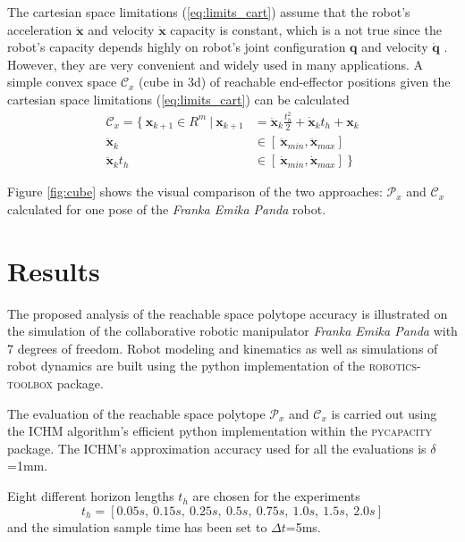 The cartesian space limitations (\ref{eq:limits_cart}) assume that the robot's acceleration $\ddot{\bm{x}}$ and velocity $\dot{\bm{x}}$ capacity is constant, which is a not true since the robot's capacity depends highly on robot's joint configuration $\bm{q}$ and velocity  $\dot{\bm{q}}$ \cite{Bowling2005}\cite{skuric2021}. However, they are very convenient and widely used in many applications. A simple convex space $\mathcal{C}_x$ (cube in 3d) of reachable end-effector positions given the cartesian space limitations (\ref{eq:limits_cart}) can be calculated
\begin{equation}
\begin{split}
    \mathcal{C}_x = \{ ~\bm{x}_{k+1} \in R^m ~|~ \bm{x}_{k+1} &= \ddot{\bm{x}}_{k}\frac{t_h^2}{2} + \dot{\bm{x}}_kt_h + \bm{x}_k \\
    \ddot{\bm{x}}_{k} &\in [~ \ddot{\bm{x}}_{min},  \ddot{\bm{x}}_{max}]\\
    \ddot{\bm{x}}_{k}t_h &\in [~ \dot{\bm{x}}_{min},  \dot{\bm{x}}_{max}] ~\}
\end{split}
\end{equation}

Figure \ref{fig:cube} shows the visual comparison of the two approaches: $\mathcal{P}_x$ and $\mathcal{C}_x$ calculated for one pose of the \textit{Franka Emika Panda} robot. 

\vspace{-0.2cm}
\section{Results}
\label{ch:results}
\vspace{-0.2cm}
The proposed analysis of the reachable space polytope accuracy is illustrated on the simulation of the collaborative robotic manipulator \textit{Franka Emika Panda} with 7 degrees of freedom.
Robot modeling and kinematics as well as simulations of robot dynamics are built using the python implementation of the \textsc{robotics-toolbox}\cite{rtb} package. 

The evaluation of the reachable space polytope $\mathcal{P}_x$ and $\mathcal{C}_x$ is carried out using the ICHM algorithm's efficient python implementation within the \textsc{pycapacity}\cite{pycapacity} package. The ICHM's approximation accuracy used for all the evaluations is $\delta$=1mm.

Eight different horizon lengths $t_h$ are chosen for the experiments
$$
t_h = [0.05s, ~ 0.15s, ~ 0.25s, ~ 0.5s,~ 0.75s,~ 1.0s,~ 1.5s, ~ 2.0s]
$$
and the simulation sample time has been set to $\Delta t$=5ms. 

